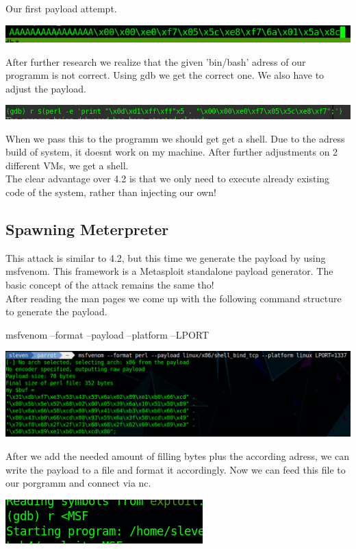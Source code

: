 \documentclass[a4paper,10pt]{article}
\begin{document}
Our first payload attempt.
\begin{center}
\includegraphics[scale=0.5]{pay.png} 
\end{center}
After further research we realize that the given 'bin/bash' adress of our programm is not correct. Using gdb we get the correct one. We also have to adjust the payload.
\begin{center}
 \includegraphics[scale=0.5]{pay3.png}
\end{center}
When we pass this to the programm we should get get a shell. Due to the adress build of system, it doesnt work on my machine. After further adjustments on 2 different VMs, we get a shell.\\
The clear advantage over 4.2 is that we only need to execute already existing code of the system, rather than injecting our own!
\newpage
\subsection{Spawning Meterpreter}
This attack is similar to 4.2, but this time we generate the payload by using msfvenom. This framework is a Metasploit standalone payload generator. The basic concept of the attack remains the same tho!\\
After reading the man pages we come up with the following command structure to generate the payload.
\begin{center}
 msfvenom --format --payload --platform --LPORT 
\end{center}
\begin{center}
 \includegraphics[scale=0.4]{pay4.png}
\end{center}
After we add the needed amount of filling bytes plus the according adress, we can write the payload to a file and format it accordingly. Now we can feed this file to our porgramm and connect via nc.
\begin{center}
 \includegraphics[scale=0.5]{pay6.png}
\end{center}
\end{document}
